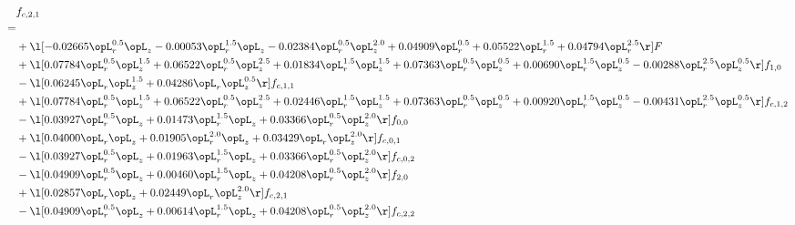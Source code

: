 \begin{alignat}{2} 
\label{eq:f_21_1} 
& f_{c,2,1} \nonumber \\ 
 = \\ 
& + \l[  -0.02665 \opL_r^{0.5} \opL_z   -0.00053 \opL_r^{1.5} \opL_z   -0.02384 \opL_r^{0.5} \opL_z^{2.0} +  0.04909 \opL_r^{0.5} +  0.05522 \opL_r^{1.5} +  0.04794 \opL_r^{2.5}  \r] F \nonumber \\ 
& + \l[  0.07784 \opL_r^{0.5} \opL_z^{1.5} +  0.06522 \opL_r^{0.5} \opL_z^{2.5} +  0.01834 \opL_r^{1.5} \opL_z^{1.5} +  0.07363 \opL_r^{0.5} \opL_z^{0.5} +  0.00690 \opL_r^{1.5} \opL_z^{0.5}   -0.00288 \opL_r^{2.5} \opL_z^{0.5}  \r] f_{1,0} \nonumber \\ 
& - \l[  0.06245 \opL_r \opL_z^{1.5} +  0.04286 \opL_r \opL_z^{0.5}  \r] f_{c,1,1} \nonumber \\ 
& + \l[  0.07784 \opL_r^{0.5} \opL_z^{1.5} +  0.06522 \opL_r^{0.5} \opL_z^{2.5} +  0.02446 \opL_r^{1.5} \opL_z^{1.5} +  0.07363 \opL_r^{0.5} \opL_z^{0.5} +  0.00920 \opL_r^{1.5} \opL_z^{0.5}   -0.00431 \opL_r^{2.5} \opL_z^{0.5}  \r] f_{c,1,2} \nonumber \\ 
& - \l[  0.03927 \opL_r^{0.5} \opL_z +  0.01473 \opL_r^{1.5} \opL_z +  0.03366 \opL_r^{0.5} \opL_z^{2.0}  \r] f_{0,0} \nonumber \\ 
& + \l[  0.04000 \opL_r \opL_z +  0.01905 \opL_r^{2.0} \opL_z +  0.03429 \opL_r \opL_z^{2.0}  \r] f_{c,0,1} \nonumber \\ 
& - \l[  0.03927 \opL_r^{0.5} \opL_z +  0.01963 \opL_r^{1.5} \opL_z +  0.03366 \opL_r^{0.5} \opL_z^{2.0}  \r] f_{c,0,2} \nonumber \\ 
& - \l[  0.04909 \opL_r^{0.5} \opL_z +  0.00460 \opL_r^{1.5} \opL_z +  0.04208 \opL_r^{0.5} \opL_z^{2.0}  \r] f_{2,0} \nonumber \\ 
& + \l[  0.02857 \opL_r \opL_z +  0.02449 \opL_r \opL_z^{2.0}  \r] f_{c,2,1} \nonumber \\ 
& - \l[  0.04909 \opL_r^{0.5} \opL_z +  0.00614 \opL_r^{1.5} \opL_z +  0.04208 \opL_r^{0.5} \opL_z^{2.0}  \r] f_{c,2,2} \nonumber \\ 
\end{alignat} 


